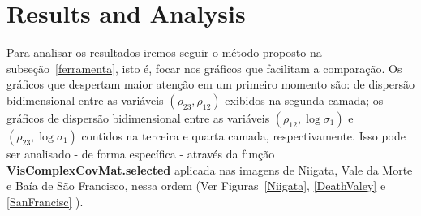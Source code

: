 \documentclass[journal]{IEEEtran}
\begin{document}
\section{Results and Analysis}\label{quatro}

Para analisar os resultados iremos seguir o método proposto na subseção~\ref{ferramenta}, isto é, focar nos gráficos que facilitam a comparação. Os gráficos que despertam maior atenção em um primeiro momento são: de dispersão bidimensional entre as variáveis $(\rho_{23}, \rho_{12})$ exibidos na segunda camada; os gráficos de dispersão bidimensional entre as variáveis $(\rho_{12},\log\sigma_{1})$ e $(\rho_{23},\log\sigma_{1})$ contidos na terceira e quarta camada, respectivamente. Isso pode ser analisado - de forma específica - através da função \textbf{VisComplexCovMat.selected} aplicada nas imagens de Niigata, Vale da Morte e Baía de São Francisco, nessa ordem (Ver Figuras~\ref{Niigata}, \ref{DeathValey} e \ref{SanFrancisc} ).
\end{document}
